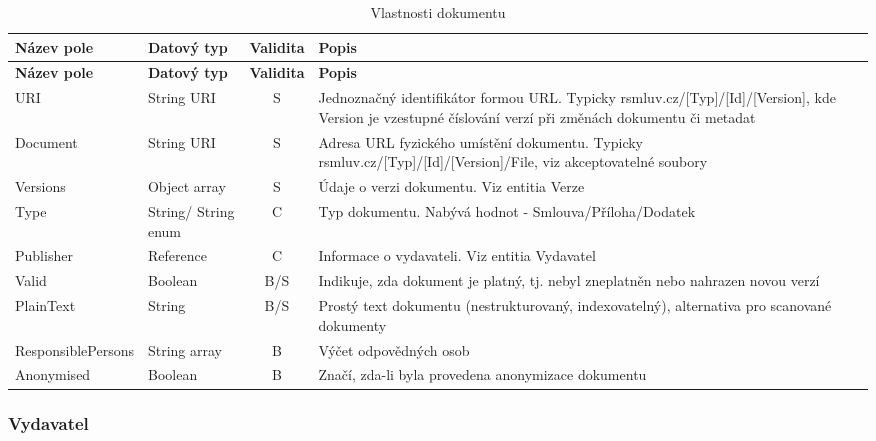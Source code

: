 \begin{center}
\begin{longtable}{lp{20mm}cp{65mm}}
\label{grid_mlmmh} \\
\multicolumn{1}{l}{\textbf{Název pole}} & 
\multicolumn{1}{l}{\textbf{Datový typ}} & 
\multicolumn{1}{l}{\textbf{Validita}} & 
\multicolumn{1}{l}{\textbf{Popis}} \\ \hline 
\endfirsthead
\multicolumn{1}{l}{\textbf{Název pole}} & 
\multicolumn{1}{l}{\textbf{Datový typ}} & 
\multicolumn{1}{l}{\textbf{Validita}} & 
\multicolumn{1}{l}{\textbf{Popis}} \\ \hline 
\hline
\endhead
\endfoot
\caption{Vlastnosti dokumentu}
\endlastfoot
\rowcolor{validateS}URI & String URI & S & Jednoznačný identifikátor formou URL. Typicky rsmluv.cz/[Typ]/[Id]/[Version], kde Version je vzestupné číslování verzí při změnách dokumentu či metadat \\
\rowcolor{validateS}Document & String URI & S & Adresa URL fyzického umístění dokumentu. Typicky rsmluv.cz/[Typ]/[Id]/[Version]/File, viz akceptovatelné soubory \\
\rowcolor{validateS}Versions & Object array & S & Údaje o verzi dokumentu. Viz entitia Verze \\
\rowcolor{validateC}Type & String/ String enum & C & Typ dokumentu. Nabývá hodnot - Smlouva/Příloha/Dodatek \\
\rowcolor{validateC}Publisher & Reference & C & Informace o vydavateli. Viz entitia Vydavatel \\
\rowcolor{validateB}Valid & Boolean & B/S & Indikuje, zda dokument je platný, tj. nebyl zneplatněn nebo nahrazen novou verzí \\
\rowcolor{validateB}PlainText & String & B/S & Prostý text dokumentu (nestrukturovaný, indexovatelný), alternativa pro scanované dokumenty \\
\rowcolor{validateB}ResponsiblePersons & String array & B & Výčet odpovědných osob \\
\rowcolor{validateB}Anonymised & Boolean & B & Značí, zda-li byla provedena anonymizace dokumentu \\
\end{longtable}
\end{center}

\subsubsection*{Vydavatel}

